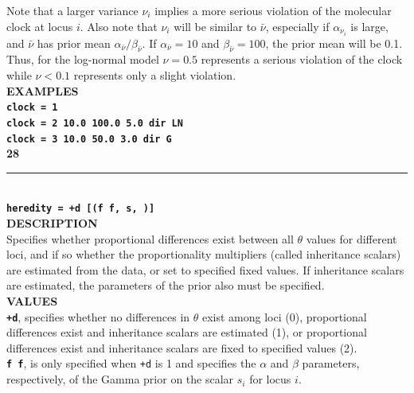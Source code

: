 \documentclass{book}
\numberwithin{equation}{section} \renewcommand{\baselinestretch}{0.55}
\begin{document}
Note that a larger variance $\nu_i$ implies a more serious violation
of the molecular clock at locus $i$.  Also note that $\nu_i$ will be
similar to $\bar\nu$, especially if $\alpha_{\nu_i}$ is large, and
$\bar\nu$ has prior mean $\alpha_{\bar{\nu}} / \beta_{\bar{\nu}}$.  If
$\alpha_{\bar{\nu}} = 10$ and $\beta_{\bar{\nu}} = 100$, the prior
mean will be 0.1. Thus, for the log-normal model $\nu = 0.5$
represents a serious violation of the clock while $\nu < 0.1$ represents only a slight violation. \vspace{5pt}\\
\textbf{EXAMPLES} \vspace{5pt}\\
\textbf{\texttt{clock = 1}} \vspace{5pt}\\
\textbf{\texttt{clock = 2 10.0 100.0 5.0 dir LN}}\vspace{5pt}\\
\textbf{\texttt{clock = 3 10.0 50.0 3.0 dir G}}\vspace{10pt}\\
\textbf{{\large 28}} \\
\noindent\rule{\textwidth}{0.8pt} \\
\textbf{{\Large \texttt{heredity = +d [(f f, s, )]}}} \vspace{5pt}\\
\textbf{DESCRIPTION} \vspace{5pt}\\
Specifies whether proportional differences exist between all $\theta$
values for different loci, and if so whether the proportionality
multipliers (called inheritance scalars) are estimated from the data,
or set to specified fixed values. If inheritance scalars are
estimated, the parameters of the prior also must be specified.
\vspace{5pt}\\
\textbf{VALUES} \vspace{5pt}\\
\textbf{\texttt{+d}}, specifies whether no differences in $\theta$
exist among loci (0), proportional differences exist and inheritance
scalars are estimated (1), or proportional
differences exist and inheritance scalars are fixed to specified values (2). \vspace{5pt}\\
\textbf{\texttt{f f}}, is only specified when \texttt{+d} is 1 and
specifies the $\alpha$ and
$\beta$ parameters, respectively, of the Gamma prior on the scalar $s_i$ for locus $i$. \vspace{5pt}\\
\end{document}
